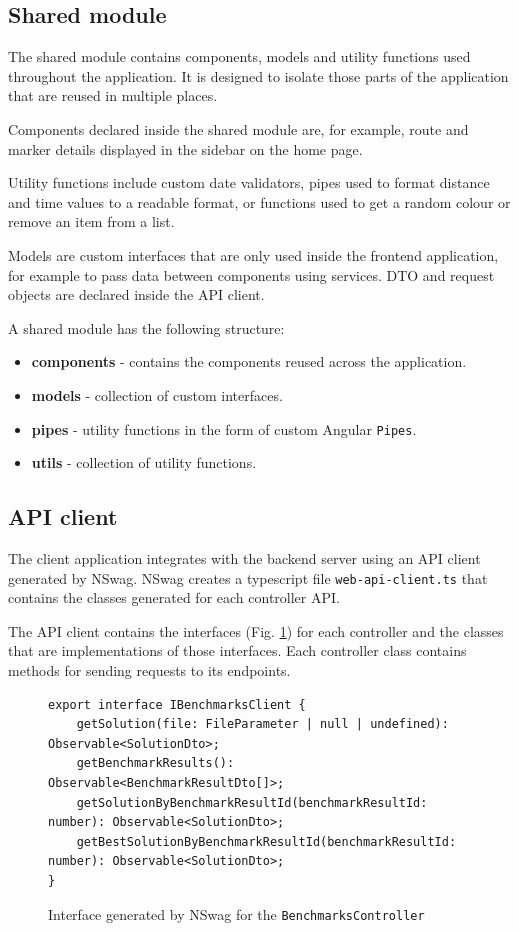 \documentclass[a4paper,twoside,12pt]{book}
\begin{document}
\subsection{Shared module}

The shared module contains components, models and utility functions used throughout the application. It is designed to isolate those parts of the application that are reused in multiple places. 

Components declared inside the shared module are, for example, route and marker details displayed in the sidebar on the home page. 

Utility functions include custom date validators, pipes used to format distance and time values to a readable format, or functions used to get a random colour or remove an item from a list. 

Models are custom interfaces that are only used inside the frontend application, for example to pass data between components using services. DTO and request objects are declared inside the API client.

A shared module has the following structure:

\begin{itemize}
    \item \textbf{components} - contains the components reused across the application.
    \item \textbf{models} - collection of custom interfaces.
    \item \textbf{pipes} - utility functions in the form of custom Angular \lstinline{Pipes}.
    \item \textbf{utils} - collection of utility functions.
\end{itemize}

\subsection{API client}

The client application integrates with the backend server using an API client generated by NSwag. NSwag creates a typescript file \lstinline{web-api-client.ts} that contains the classes generated for each controller API. 

The API client contains the interfaces (Fig. \ref{fig:controllerInterface}) for each controller and the classes that are implementations of those interfaces. Each controller class contains methods for sending requests to its endpoints.

\begin{figure}[H]
\centering
\begin{lstlisting}
export interface IBenchmarksClient {
    getSolution(file: FileParameter | null | undefined): Observable<SolutionDto>;
    getBenchmarkResults(): Observable<BenchmarkResultDto[]>;
    getSolutionByBenchmarkResultId(benchmarkResultId: number): Observable<SolutionDto>;
    getBestSolutionByBenchmarkResultId(benchmarkResultId: number): Observable<SolutionDto>;
}
\end{lstlisting}
\caption{Interface generated by NSwag for the \lstinline{BenchmarksController}}
\label{fig:controllerInterface}
\end{figure}
\end{document}
